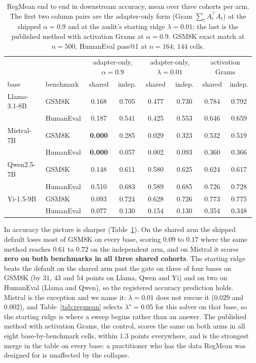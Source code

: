 \begin{table}[t]
\centering
\small
\caption{RegMean end to end in downstream accuracy, mean over three cohorts per
arm. The first two column pairs are the adapter-only form (Gram
$\sum_t A_t^\top A_t$) at the shipped $\alpha = 0.9$ and at the audit's starting
ridge $\lambda = 0.01$; the last is the published method with activation Grams
at $\alpha = 0.9$. GSM8K exact match at $n = 500$, HumanEval pass@1 at
$n = 164$; $144$ cells.}
\label{tab:regmean-acc}
\begin{tabular}{llcccccc}
\toprule
 & & \multicolumn{2}{c}{adapter-only, $\alpha{=}0.9$}
   & \multicolumn{2}{c}{adapter-only, $\lambda{=}0.01$}
   & \multicolumn{2}{c}{activation Grams} \\
base & benchmark & shared & indep. & shared & indep. & shared & indep. \\
\midrule
Llama-3.1-8B & GSM8K     & 0.168 & 0.705 & 0.477 & 0.730 & 0.784 & 0.792 \\
             & HumanEval & 0.187 & 0.541 & 0.425 & 0.553 & 0.646 & 0.659 \\
Mistral-7B   & GSM8K     & \textbf{0.000} & 0.285 & 0.029 & 0.323 & 0.532 & 0.519 \\
             & HumanEval & \textbf{0.000} & 0.057 & 0.002 & 0.093 & 0.360 & 0.366 \\
Qwen2.5-7B   & GSM8K     & 0.148 & 0.611 & 0.580 & 0.625 & 0.624 & 0.617 \\
             & HumanEval & 0.510 & 0.683 & 0.589 & 0.685 & 0.726 & 0.728 \\
Yi-1.5-9B    & GSM8K     & 0.093 & 0.724 & 0.628 & 0.726 & 0.773 & 0.775 \\
             & HumanEval & 0.077 & 0.130 & 0.154 & 0.130 & 0.354 & 0.348 \\
\bottomrule
\end{tabular}
\end{table}

In accuracy the picture is sharper (Table~\ref{tab:regmean-acc}). On the shared
arm the shipped default loses most of GSM8K on every base, scoring $0.09$ to
$0.17$ where the same method reaches $0.61$ to $0.72$ on the independent arm,
and on Mistral it scores \textbf{zero on both benchmarks in all three shared
cohorts}. The starting ridge beats the default on the shared arm past the gate
on three of four bases on GSM8K (by $31$, $43$ and $54$ points on Llama, Qwen
and Yi) and on two on HumanEval (Llama and Qwen), so the registered accuracy
prediction holds. Mistral is the exception and we name it: $\lambda = 0.01$
does not rescue it ($0.029$ and $0.002$), and Table~\ref{tab:regmean} selects
$\lambda^\star = 0.05$ for this solver on that base, so the starting ridge is
where a sweep begins rather than an answer. The published method with
activation Grams, the control, scores the same on both arms in all eight
base-by-benchmark cells, within $1.3$ points everywhere, and is the strongest
merge in the table on every base: a practitioner who has the data RegMean was
designed for is unaffected by the collapse.

